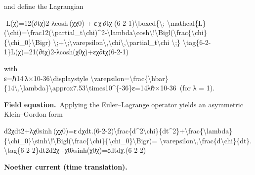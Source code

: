 \documentclass[
]{article}
\begin{document}
and define the Lagrangian

  L(χ)=12(∂tχ)2-λcosh⁡ ⁣(χχ0)  +  ε χ ∂tχ  (6-2-1)\textbackslash boxed\{\textbackslash;
\textbackslash mathcal\{L\}(\textbackslash chi)=\textbackslash frac12(\textbackslash partial\_t\textbackslash chi)\^{}2-\textbackslash lambda\textbackslash cosh\textbackslash!\textbackslash Bigl(\textbackslash frac\{\textbackslash chi\}\{\textbackslash chi\_0\}\textbackslash Bigr)
\textbackslash;+\textbackslash;\textbackslash varepsilon\textbackslash,\textbackslash chi\textbackslash,\textbackslash partial\_t\textbackslash chi
\textbackslash;\}
\textbackslash tag\{6-2-1\}L(χ)=21\hspace{0pt}(∂t\hspace{0pt}χ)2-λcosh(χ0\hspace{0pt}χ\hspace{0pt})+εχ∂t\hspace{0pt}χ\hspace{0pt}(6-2-1)

with\\
ε=ℏ14 λ×10-36\textbackslash displaystyle
\textbackslash varepsilon=\textbackslash frac\{\textbackslash hbar\}\{14\textbackslash,\textbackslash lambda\}\textbackslash approx7.53\textbackslash times10\^{}\{-36\}ε=14λℏ\hspace{0pt}×10-36 (for
λ = 1).

\textbf{Field equation.} Applying the Euler--Lagrange operator yields an
asymmetric Klein--Gordon form

d2χdt2+λχ0sinh⁡ ⁣(χχ0)=ε dχdt.(6-2-2)\textbackslash frac\{d\^{}2\textbackslash chi\}\{dt\^{}2\}+\textbackslash frac\{\textbackslash lambda\}\{\textbackslash chi\_0\}\textbackslash sinh\textbackslash!\textbackslash Bigl(\textbackslash frac\{\textbackslash chi\}\{\textbackslash chi\_0\}\textbackslash Bigr)=
\textbackslash varepsilon\textbackslash,\textbackslash frac\{d\textbackslash chi\}\{dt\}.
\textbackslash tag\{6-2-2\}dt2d2χ\hspace{0pt}+χ0\hspace{0pt}λ\hspace{0pt}sinh(χ0\hspace{0pt}χ\hspace{0pt})=εdtdχ\hspace{0pt}.(6-2-2)

\textbf{Noether current (time translation).}
\end{document}
